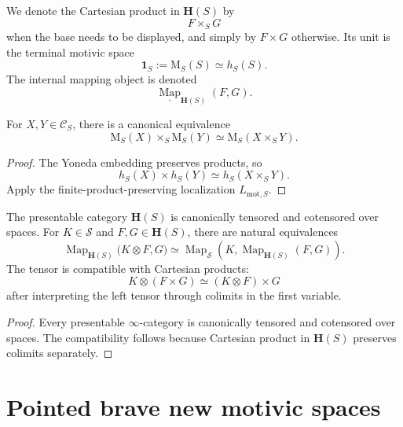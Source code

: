 \begin{notation}
\label{not:motivic-cartesian-product}
We denote the Cartesian product in \(\mathbf H(S)\) by
\[
    F\times_SG
\]
when the base needs to be displayed, and simply by \(F\times G\)
otherwise.  Its unit is the terminal motivic space
\[
    \mathbf 1_S
    :=
    \mathrm M_S(S)
    \simeq
    h_S(S).
\]
The internal mapping object is denoted
\[
    \underline{\operatorname{Map}}_{\mathbf H(S)}(F,G).
\]
\end{notation}

\begin{corollary}
\label{cor:products-of-smooth-motives}
For \(X,Y\in\mathcal C_S\), there is a canonical equivalence
\[
    \mathrm M_S(X)
    \times_S
    \mathrm M_S(Y)
    \simeq
    \mathrm M_S(X\times_SY).
\]
\end{corollary}

\begin{proof}
The Yoneda embedding preserves products, so
\[
    h_S(X)\times h_S(Y)
    \simeq
    h_S(X\times_SY).
\]
Apply the finite-product-preserving localization
\(L_{\mathrm{mot},S}\).
\end{proof}

\begin{proposition}
\label{prop:motivic-tensored-over-spaces}
The presentable category \(\mathbf H(S)\) is canonically tensored and
cotensored over spaces.  For \(K\in\mathcal S\) and
\(F,G\in\mathbf H(S)\), there are natural equivalences
\[
    \operatorname{Map}_{\mathbf H(S)}
    \bigl(
        K\otimes F,
        G
    \bigr)
    \simeq
    \operatorname{Map}_{\mathcal S}
    \left(
        K,
        \operatorname{Map}_{\mathbf H(S)}(F,G)
    \right).
\]
The tensor is compatible with Cartesian products:
\[
    K\otimes(F\times G)
    \simeq
    (K\otimes F)\times G
\]
after interpreting the left tensor through colimits in the first
variable.
\end{proposition}

\begin{proof}
Every presentable \(\infty\)-category is canonically tensored and
cotensored over spaces.  The compatibility follows because Cartesian
product in \(\mathbf H(S)\) preserves colimits separately.
\end{proof}

\section{Pointed brave new motivic spaces}
\label{sec:pointed-brave-new-motivic-spaces}

